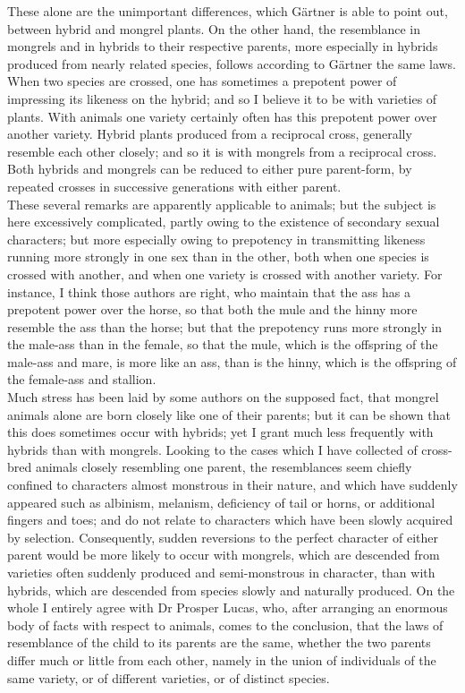 \indent These alone are the unimportant differences, which G\"{a}rtner is able to point out, between hybrid and mongrel plants. On the other hand, the resemblance in mongrels and in hybrids to their respective parents, more especially in hybrids produced from nearly related species, follows according to G\"{a}rtner the same laws. When two species are crossed, one has sometimes a prepotent power of impressing its likeness on the hybrid; and so I believe it to be with varieties of plants. With animals one variety certainly often has this prepotent power over another variety. Hybrid plants produced from a reciprocal cross, generally resemble each other closely; and so it is with mongrels from a reciprocal cross. Both hybrids and mongrels can be reduced to either pure parent-form, by repeated crosses in successive generations with either parent.\\
\indent These several remarks are apparently applicable to animals; but the subject is here excessively complicated, partly owing to the existence of secondary sexual characters; but more especially owing to prepotency in transmitting likeness running more strongly in one sex than in the other, both when one species is crossed with another, and when one variety is crossed with another variety. For instance, I think those authors are right, who maintain that the ass has a prepotent power over the horse, so that both the mule and the hinny more resemble the ass than the horse; but that the prepotency runs more strongly in the male-ass than in the female, so that the mule, which is the offspring of the male-ass and mare, is more like an ass, than is the hinny, which is the offspring of the female-ass and stallion.\\
\indent Much stress has been laid by some authors on the supposed fact, that mongrel animals alone are born closely like one of their parents; but it can be shown that this does sometimes occur with hybrids; yet I grant much less frequently with hybrids than with mongrels. Looking to the cases which I have collected of cross-bred animals closely resembling one parent, the resemblances seem chiefly confined to characters almost monstrous in their nature, and which have suddenly appeared such as albinism, melanism, deficiency of tail or horns, or additional fingers and toes; and do not relate to characters which have been slowly acquired by selection. Consequently, sudden reversions to the perfect character of either parent would be more likely to occur with mongrels, which are descended from varieties often suddenly produced and semi-monstrous in character, than with hybrids, which are descended from species slowly and naturally produced. On the whole I entirely agree with Dr Prosper Lucas, who, after arranging an enormous body of facts with respect to animals, comes to the conclusion, that the laws of resemblance of the child to its parents are the same, whether the two parents differ much or little from each other, namely in the union of individuals of the same variety, or of different varieties, or of distinct species.\\
